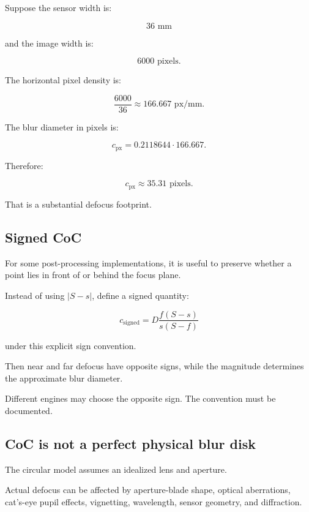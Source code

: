 \hypertarget{02-foundations-ii-ch036-coc-in-pixels}{}

Suppose the sensor width is:

\[ 36\text{ mm} \]

and the image width is:

\[ 6000\text{ pixels}. \]

The horizontal pixel density is:

\[ \frac{6000}{36} \approx166.667\text{ px/mm}. \]

The blur diameter in pixels is:

\[ c_{\mathrm{px}} = 0.2118644 \cdot166.667. \]

Therefore:

\[ \boxed{ c_{\mathrm{px}}\approx35.31\text{ pixels}. } \]

That is a substantial defocus footprint.

\subsection{Signed CoC}\label{02-foundations-ii-ch036-signed-coc}

\hypertarget{02-foundations-ii-ch036-signed-coc}{}

For some post-processing implementations, it is useful to preserve whether a point lies in front of or behind the focus plane.

Instead of using \(|S-s|\), define a signed quantity:

\[ \boxed{ c_{\mathrm{signed}} = D\frac{f(S-s)}{s(S-f)} } \]

under this explicit sign convention.

Then near and far defocus have opposite signs, while the magnitude determines the approximate blur diameter.

Different engines may choose the opposite sign. The convention must be documented.

\subsection{CoC is not a perfect physical blur disk}\label{02-foundations-ii-ch036-coc-is-not-a-perfect-physical-blur-disk}

\hypertarget{02-foundations-ii-ch036-coc-is-not-a-perfect-physical-blur-disk}{}

The circular model assumes an idealized lens and aperture.

Actual defocus can be affected by aperture-blade shape, optical aberrations, cat's-eye pupil effects, vignetting, wavelength, sensor geometry, and diffraction.

